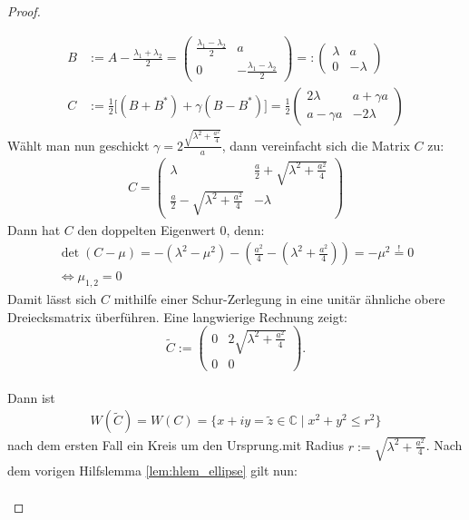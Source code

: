 \begin{proof}
\begin{enumerate}[label=\protect\circled{\arabic*}]
		\begin{align*}
			B &:= A - \frac{\lambda_1+\lambda_2}{2} = \begin{pmatrix}
				\frac{\lambda_1-\lambda_2}{2} & a \\
				0 & - \frac{\lambda_1-\lambda_2}{2}
			\end{pmatrix} =: \begin{pmatrix}
				\lambda & a \\
				0 & - \lambda
			\end{pmatrix} \\
			C &:= \frac{1}{2} \bigg[ (B+B^*)+\gamma(B-B^*) \bigg] = \frac{1}{2}\begin{pmatrix}
				2\lambda & a+ \gamma a \\
				a - \gamma a & -2\lambda 
			\end{pmatrix}
		\end{align*}
		Wählt man nun geschickt $\gamma=2\frac{\sqrt{\lambda^2+\frac{a^2}{4}}}{a}$, dann vereinfacht sich die Matrix $C$ zu:
		\begin{align*}
			C = \begin{pmatrix}
				\lambda & \frac{a}{2}+ \sqrt{\lambda^2+\frac{a^2}{4}}  \\
				\frac{a}{2}- \sqrt{\lambda^2+\frac{a^2}{4}} & - \lambda  
			\end{pmatrix}
		\end{align*}
		Dann hat $C$ den doppelten Eigenwert 0, denn:
		\begin{align}
			\det(C - \mu) = -(\lambda^2-\mu^2) - (\frac{a^2}{4}-(\lambda^2+\frac{a^2}{4})) = -\mu^2  \overset{!}{=} 0 \nonumber \\
			\iff \mu_{1,2} = 0
		\end{align}
		Damit lässt sich $C$ mithilfe einer Schur-Zerlegung in eine unitär ähnliche obere Dreiecksmatrix überführen. Eine langwierige Rechnung zeigt:
		\[ \widetilde{C} := \begin{pmatrix}
			0 & 2\sqrt{\lambda^2+\frac{a^2}{4}} \\
			0 & 0
		\end{pmatrix}.\] \\ 
		Dann ist 
		\begin{align} \label{eq:numran_c}
			W(\widetilde{C})=W(C)=\{ x+iy=\widetilde{z} \in \mathbb{C} \; | \; x^2 + y^2 \le r^2 \}	
		\end{align}
		nach dem ersten Fall ein Kreis um den Ursprung.mit Radius $r := \sqrt{\lambda^2+\frac{a^2}{4}}$. Nach dem vorigen Hilfslemma \ref{lem:hlem_ellipse} gilt nun:
		\begin{align*}

\end{align*}
\end{enumerate}
\end{proof}

